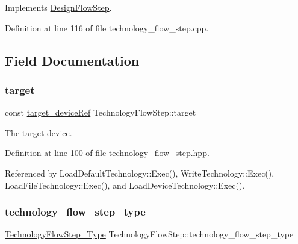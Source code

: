 Implements \hyperlink{classDesignFlowStep_a1783abe0c1d162a52da1e413d5d1ef05}{Design\+Flow\+Step}.



Definition at line 116 of file technology\+\_\+flow\+\_\+step.\+cpp.



\subsection{Field Documentation}
\mbox{\label{classTechnologyFlowStep_a1a16880c55bddc3f9dbc495636d7a8cb}} 
\subsubsection{\texorpdfstring{target}{target}}
{\footnotesize\ttfamily const \hyperlink{target__device_8hpp_acedb2b7a617e27e6354a8049fee44eda}{target\+\_\+device\+Ref} Technology\+Flow\+Step\+::target\hspace{0.3cm}{\ttfamily [protected]}}



The target device. 



Definition at line 100 of file technology\+\_\+flow\+\_\+step.\+hpp.



Referenced by Load\+Default\+Technology\+::\+Exec(), Write\+Technology\+::\+Exec(), Load\+File\+Technology\+::\+Exec(), and Load\+Device\+Technology\+::\+Exec().

\mbox{\label{classTechnologyFlowStep_a599a03a1ab1c3a71f3ac3bfbaed868b4}} 
\subsubsection{\texorpdfstring{technology\+\_\+flow\+\_\+step\+\_\+type}{technology\_flow\_step\_type}}
{\footnotesize\ttfamily \hyperlink{technology__flow__step_8hpp_a65208cfec963a7d7def292f9db428292}{Technology\+Flow\+Step\+\_\+\+Type} Technology\+Flow\+Step\+::technology\+\_\+flow\+\_\+step\+\_\+type\hspace{0.3cm}{\ttfamily [protected]}}



